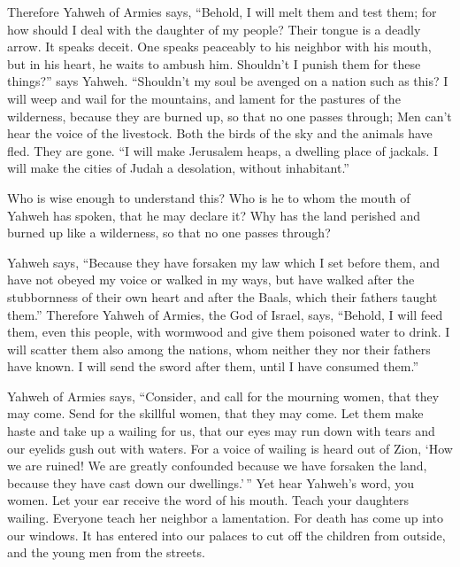  Therefore Yahweh of Armies says, ``Behold, I will melt
them and test them; for how should I deal with the daughter of my
people?  Their tongue is a deadly arrow. It speaks deceit.
One speaks peaceably to his neighbor with his mouth, but in his heart,
he waits to ambush him.  Shouldn't I punish them for these
things?'' says Yahweh. ``Shouldn't my soul be avenged on a nation such
as this?  I will weep and wail for the mountains, and
lament for the pastures of the wilderness, because they are burned up,
so that no one passes through; Men can't hear the voice of the
livestock. Both the birds of the sky and the animals have fled. They are
gone.  ``I will make Jerusalem heaps, a dwelling place of
jackals. I will make the cities of Judah a desolation, without
inhabitant.''

 Who is wise enough to understand this? Who is he to whom
the mouth of Yahweh has spoken, that he may declare it? Why has the land
perished and burned up like a wilderness, so that no one passes through?

 Yahweh says, ``Because they have forsaken my law which I
set before them, and have not obeyed my voice or walked in my ways,
 but have walked after the stubbornness of their own
heart and after the Baals, which their fathers taught them.''
 Therefore Yahweh of Armies, the God of Israel, says,
``Behold, I will feed them, even this people, with wormwood and give
them poisoned water to drink.  I will scatter them also
among the nations, whom neither they nor their fathers have known. I
will send the sword after them, until I have consumed them.''

 Yahweh of Armies says, ``Consider, and call for the
mourning women, that they may come. Send for the skillful women, that
they may come.  Let them make haste and take up a wailing
for us, that our eyes may run down with tears and our eyelids gush out
with waters.  For a voice of wailing is heard out of
Zion, `How we are ruined! We are greatly confounded because we have
forsaken the land, because they have cast down our dwellings.'\,''
 Yet hear Yahweh's word, you women. Let your ear receive
the word of his mouth. Teach your daughters wailing. Everyone teach her
neighbor a lamentation.  For death has come up into our
windows. It has entered into our palaces to cut off the children from
outside, and the young men from the streets.

